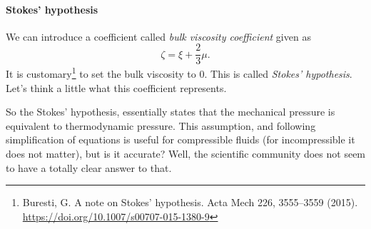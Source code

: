\documentclass{article}
\begin{document}
\paragraph{Stokes' hypothesis}
We can introduce a coefficient called \emph{bulk viscosity coefficient} given 
as 
\[
  \zeta = \xi + \dfrac{2}{3}\mu.
\]
It is customary\footnote{Buresti, G. A note on Stokes’ hypothesis. Acta Mech 226, 
3555–3559 (2015). \url{https://doi.org/10.1007/s00707-015-1380-9}} to set the 
bulk viscosity to 0. This is called \emph{Stokes' hypothesis}. Let's think a 
little what this coefficient represents.
\begin{quote}
  \footnotemark[\value{footnote}]
\end{quote}
So the Stokes' hypothesis, essentially states that the mechanical pressure is 
equivalent to thermodynamic pressure. This assumption, and following
simplification of equations is useful for compressible fluids (for
incompressible it does not matter), but is it accurate? Well, the scientific 
community does not seem to have a totally clear answer to that. 
\end{document}
